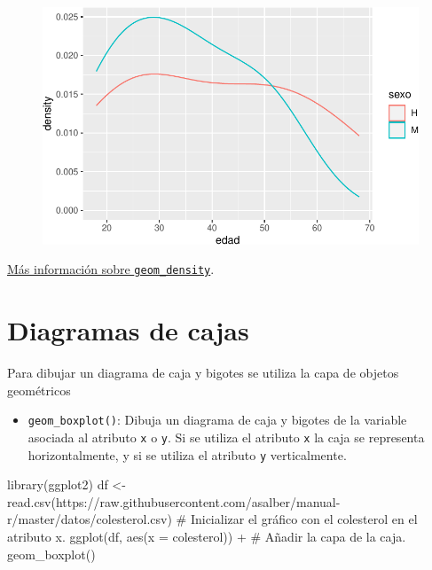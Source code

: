 \documentclass[
  a4paper,
]{scrreport}
\newenvironment{Shaded}{\begin{snugshade}}{\end{snugshade}}
\newcommand{\AttributeTok}[1]{\textcolor[rgb]{0.40,0.45,0.13}{#1}}
\newcommand{\CommentTok}[1]{\textcolor[rgb]{0.37,0.37,0.37}{#1}}
\newcommand{\FunctionTok}[1]{\textcolor[rgb]{0.28,0.35,0.67}{#1}}
\newcommand{\NormalTok}[1]{\textcolor[rgb]{0.00,0.23,0.31}{#1}}
\newcommand{\OtherTok}[1]{\textcolor[rgb]{0.00,0.23,0.31}{#1}}
\newcommand{\SpecialCharTok}[1]{\textcolor[rgb]{0.37,0.37,0.37}{#1}}
\newcommand{\StringTok}[1]{\textcolor[rgb]{0.13,0.47,0.30}{#1}}
\providecommand{\tightlist}{%
  \setlength{\itemsep}{0pt}\setlength{\parskip}{0pt}}\usepackage{longtable,booktabs,array}
\theoremstyle{definition}
\theoremstyle{definition}
\theoremstyle{remark}
\begin{document}
\begin{figure}[H]

{\centering \includegraphics{07-graficos_files/figure-pdf/unnamed-chunk-20-1.pdf}

}

\end{figure}

\href{https://ggplot2.tidyverse.org/reference/geom_density.html}{Más
información sobre \texttt{geom\_density}}.

\hypertarget{diagramas-de-cajas}{%
\section{Diagramas de cajas}\label{diagramas-de-cajas}}

Para dibujar un diagrama de caja y bigotes se utiliza la capa de objetos
geométricos

\begin{itemize}
\tightlist
\item
  \texttt{geom\_boxplot()}: Dibuja un diagrama de caja y bigotes de la
  variable asociada al atributo \texttt{x} o \texttt{y}. Si se utiliza
  el atributo \texttt{x} la caja se representa horizontalmente, y si se
  utiliza el atributo \texttt{y} verticalmente.
\end{itemize}

\begin{Shaded}
\begin{Highlighting}[]
\FunctionTok{library}\NormalTok{(ggplot2)}
\NormalTok{df }\OtherTok{\textless{}{-}} \FunctionTok{read.csv}\NormalTok{(}\StringTok{\textquotesingle{}https://raw.githubusercontent.com/asalber/manual{-}r/master/datos/colesterol.csv\textquotesingle{}}\NormalTok{)}
\CommentTok{\# Inicializar el gráfico con el colesterol en el atributo x.}
\FunctionTok{ggplot}\NormalTok{(df, }\FunctionTok{aes}\NormalTok{(}\AttributeTok{x =}\NormalTok{ colesterol)) }\SpecialCharTok{+}
\CommentTok{\# Añadir la capa de la caja.}
    \FunctionTok{geom\_boxplot}\NormalTok{()}
\end{Highlighting}
\end{Shaded}
\end{document}
